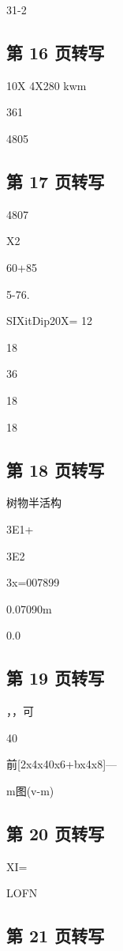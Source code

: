 31-2

\subsection*{第 16 页转写}
10X 4X280 kwm

361

4805

\subsection*{第 17 页转写}
4807

X2

60+85

5-76.

SIXitDip20X= 12

18

36

18

18

\subsection*{第 18 页转写}
树物半活构

3E1+

3E2

3x=007899

0.07090m

0.0

\subsection*{第 19 页转写}
，，可

40

前[2x4x40x6+bx4x8]---

m图(v-m)

\subsection*{第 20 页转写}
XI=

LOFN

\subsection*{第 21 页转写}
\emph{}

